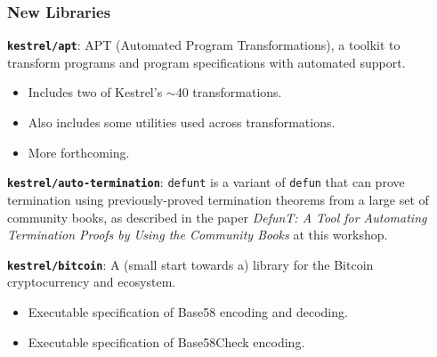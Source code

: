 \documentclass{beamer}
\newcommand{\code}[1]{\texttt{#1}}
\newcommand{\bookpath}[1]{\textbf{\code{#1}}}
\newcommand{\newlibtitle}{\frametitle{New Libraries}}
\newcommand{\separation}{\vspace*{1ex}}
\begin{document}

\begin{frame}

\newlibtitle

\bookpath{kestrel/apt}:
APT (Automated Program Transformations),
a toolkit
to transform programs and program specifications with automated support.
\begin{itemize}
\item
Includes two of Kestrel's $\sim$40 transformations.
\item
Also includes some utilities used across transformations.
\item
More forthcoming.
\end{itemize}

\separation

\bookpath{kestrel/auto-termination}:
\code{defunt} is a variant of \code{defun} that can prove termination
using previously-proved termination theorems from a large set of
community books, as described in the paper
\textit{DefunT: A Tool for Automating Termination Proofs
by Using the Community Books}
at this workshop.

\separation

\bookpath{kestrel/bitcoin}:
A (small start towards a) library for the Bitcoin cryptocurrency and ecosystem.
\begin{itemize}
\item
Executable specification of Base58 encoding and decoding.
\item
Executable specification of Base58Check encoding.
\end{itemize}

\end{frame}

\end{document}
